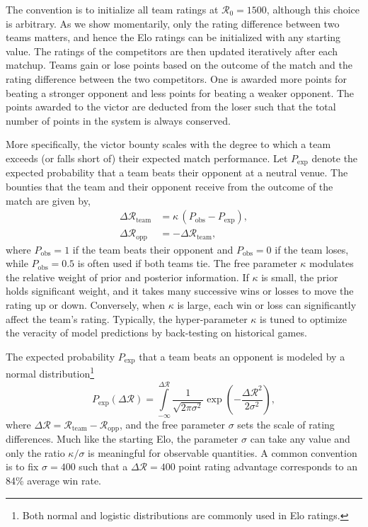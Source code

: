 \documentclass[aps,prc,reprint,amsmath,superscriptaddress,nofootinbib]{revtex4-1}
\newcommand{\R}{\mathcal{R}}
\begin{document}
The convention is to initialize all team ratings at ${\R_0 = 1500}$, although this choice is arbitrary.
As we show momentarily, only the rating difference between two teams matters, and hence the Elo ratings can be initialized with any starting value.
The ratings of the competitors are then updated iteratively after each matchup.
Teams gain or lose points based on the outcome of the match and the rating difference between the two competitors.
One is awarded more points for beating a stronger opponent and less points for beating a weaker opponent.
The points awarded to the victor are deducted from the loser such that the total number of points in the system is always conserved.

More specifically, the victor bounty scales with the degree to which a team exceeds (or falls short of) their expected match performance.
Let $P_\text{exp}$ denote the expected probability that a team beats their opponent at a neutral venue.
The bounties that the team and their opponent receive from the outcome of the match are given by,
\begin{align}
  \label{elo}
  \Delta \R_\text{team} &= \kappa \,(P_\text{obs} - P_\text{exp}),\\
  \Delta \R_\text{opp} &= -\Delta \R_\text{team},
\end{align}
where ${P_\text{obs}=1}$ if the team beats their opponent and ${P_\text{obs}=0}$ if the team loses, while $P_\text{obs}=0.5$ is often used if both teams tie.
The free parameter $\kappa$ modulates the relative weight of prior and posterior information. 
If $\kappa$ is small, the prior holds significant weight, and it takes many successive wins or losses to move the rating up or down.
Conversely, when $\kappa$ is large, each win or loss can significantly affect the team's rating.
Typically, the hyper-parameter $\kappa$ is tuned to optimize the veracity of model predictions by back-testing on historical games.

The expected probability $P_\text{exp}$ that a team beats an opponent is modeled by a normal distribution\footnote{Both normal and logistic distributions are commonly used in Elo ratings.} 
\begin{equation}
  \label{win_prob}
  P_\text{exp}(\Delta \R) = \int\limits_{-\infty}^{\Delta \R} \frac{1}{\sqrt{2\pi \sigma^2}} \exp \left( -\frac{{\Delta\R}^2}{2 \sigma^2}\right),
\end{equation}
where $\Delta \R = \R_\text{team} - \R_\text{opp}$, and the free parameter $\sigma$ sets the scale of rating differences.
Much like the starting Elo, the parameter $\sigma$ can take any value and only the ratio $\kappa/\sigma$ is meaningful for observable quantities.
A common convention is to fix $\sigma=400$ such that a $\Delta \R=400$ point rating advantage corresponds to an 84\% average win rate.
\end{document}
